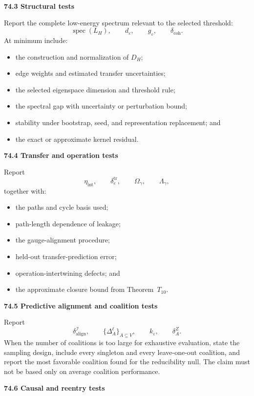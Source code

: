 \documentclass[11pt,letterpaper]{article}
\DeclareMathOperator{\spec}{spec}
\newcommand{\subtopic}[1]{%
 \vspace{0.45em}
 {\bfseries\color{AccentColor} #1\par}
}
\theoremstyle{plain}
\theoremstyle{definition}
\begin{document}
\subtopic{74.3 Structural tests}

Report the complete low-energy spectrum relevant to the selected threshold:
\[
\spec(L_H),
\qquad
 d_\varepsilon,
\qquad
 g_\varepsilon,
\qquad
 \delta_{\mathrm{coh}}.
\]
At minimum include:
\begin{itemize}
\item the construction and normalization of \(D_H\);
\item edge weights and estimated transfer uncertainties;
\item the selected eigenspace dimension and threshold rule;
\item the spectral gap with uncertainty or perturbation bound;
\item stability under bootstrap, seed, and representation replacement; and
\item the exact or approximate kernel residual.
\end{itemize}

\subtopic{74.4 Transfer and operation tests}

Report
\[
\eta_{\mathrm{int}},
\qquad
\delta_e^{\mathrm{tr}},
\qquad
\Omega_\gamma,
\qquad
\Lambda_\gamma,
\]
together with:
\begin{itemize}
\item the paths and cycle basis used;
\item path-length dependence of leakage;
\item the gauge-alignment procedure;
\item held-out transfer-prediction error;
\item operation-intertwining defects; and
\item the approximate closure bound from Theorem~\(T_{10}\).
\end{itemize}

\subtopic{74.5 Predictive alignment and coalition tests}

Report
\[
\delta_{\mathrm{align}}^{\mathcal I},
\qquad
\{\Delta_A^\ell\}_{A\subseteq V},
\qquad
 k_\varepsilon,
\qquad
\delta_A^Z.
\]
When the number of coalitions is too large for exhaustive evaluation, state the
sampling design, include every singleton and every leave-one-out coalition,
and report the most favorable coalition found for the reducibility null. The
claim must not be based only on average coalition performance.

\subtopic{74.6 Causal and reentry tests}
\end{document}
